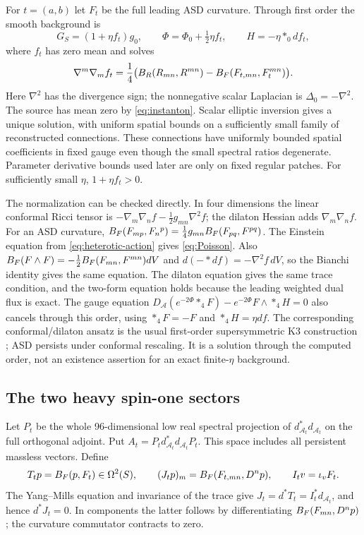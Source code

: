 For $t=(a,b)$ let $F_t$ be the full leading ASD curvature. Through first
order the smooth background is
\begin{equation}\label{eq:background}
 G_S=(1+\eta f_t)g_0,\qquad
 \Phi=\Phi_0+\tfrac12\eta f_t,\qquad H=-\eta *_0df_t,
\end{equation}
where $f_t$ has zero mean and solves
\begin{equation}\label{eq:Poisson}
 \nabla^m\nabla_m f_t
 =\frac14\bigl(B_R(R_{mn},R^{mn})-B_F(F_{t,mn},F_t^{mn})\bigr).
\end{equation}
Here $\nabla^2$ has the divergence sign; the nonnegative scalar
Laplacian is $\Delta_0=-\nabla^2$. The source has mean zero by
\eqref{eq:instanton}. Scalar elliptic inversion gives a unique
solution, with uniform spatial bounds on a sufficiently small family
of reconstructed connections. These connections have uniformly bounded
spatial coefficients in fixed gauge even though the small spectral
ratios degenerate. Parameter derivative bounds used later are only on
fixed regular patches. For sufficiently small $\eta$, $1+\eta f_t>0$.

The normalization can be checked directly. In four dimensions the
linear conformal Ricci tensor is
$-\nabla_m\nabla_nf-\tfrac12g_{mn}\nabla^2f$; the dilaton
Hessian adds $\nabla_m\nabla_nf$. For an ASD curvature,
$B_F(F_{mp},F_n{}^p)=\tfrac14g_{mn}B_F(F_{pq},F^{pq})$.
The Einstein equation from \eqref{eq:heterotic-action} gives
\eqref{eq:Poisson}. Also
$B_F(F\wedge F)=-\tfrac12B_F(F_{mn},F^{mn})dV$ and
$d(-*df)=-\nabla^2 f\,dV$, so the Bianchi identity gives the same
equation. The dilaton equation gives the same trace condition, and
the two-form equation holds because the leading weighted dual flux
is exact. The gauge equation
$D_{\mathcal A}(e^{-2\Phi}*_4F)-e^{-2\Phi}F\wedge *_4H=0$
also cancels through this order, using $*_4F=-F$ and
$*_4H=\eta df$. The corresponding conformal/dilaton ansatz is the usual
first-order supersymmetric K3 construction \cite{gpt}; ASD persists
under conformal rescaling. It is a solution through the computed
order, not an existence assertion for an exact finite-$\eta$ background.

\subsection{The two heavy spin-one sectors}
Let $P_t$ be the whole 96-dimensional low real spectral projection
of $d_{\mathcal A_t}^*d_{\mathcal A_t}$ on the full orthogonal
adjoint. Put $A_t=P_td_{\mathcal A_t}^*d_{\mathcal A_t}P_t$.
This space includes all persistent massless vectors. Define
\begin{equation}\label{eq:TJ}
 T_tp=B_F(p,F_t)\in\Omega^2(S),\qquad
 (J_tp)_m=B_F(F_{t,mn},D^np),\qquad
 I_tv=\iota_vF_t.
\end{equation}
The Yang--Mills equation and invariance of the trace give
$J_t=d^*T_t=I_t^*d_{\mathcal A_t}$, and hence $d^*J_t=0$.
In components the latter follows by differentiating
$B_F(F_{mn},D^np)$; the curvature commutator contracts to zero.

